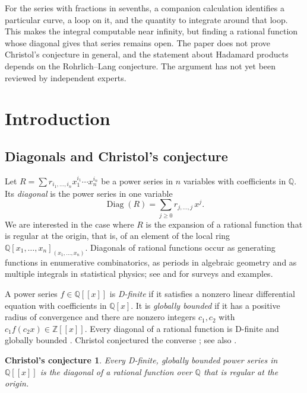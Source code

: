 \documentclass[11pt]{amsart}
\newtheorem*{conjecture*}{Christol's conjecture}
\theoremstyle{definition}
\theoremstyle{remark}
\numberwithin{equation}{section}
\newcommand{\Q}{\mathbb{Q}}
\newcommand{\Z}{\mathbb{Z}}
\DeclareMathOperator{\Diag}{Diag}
\begin{document}
For the series with fractions in sevenths, a companion calculation identifies a particular curve, a loop on it, and the quantity to integrate around that loop. This makes the integral computable near infinity, but finding a rational function whose diagonal gives that series remains open. The paper does not prove Christol's conjecture in general, and the statement about Hadamard products depends on the Rohrlich--Lang conjecture. The argument has not yet been reviewed by independent experts.

\setcounter{tocdepth}{1}
\tableofcontents

\section{Introduction}\label{sec:intro}

\subsection{Diagonals and Christol's conjecture}
Let $R=\sum r_{i_1,\dots,i_n}x_1^{i_1}\cdots x_n^{i_n}$ be a power series in $n$ variables with coefficients in $\Q$. Its \emph{diagonal} is the power series in one variable
\[
\Diag(R)=\sum_{j\ge0}r_{j,\dots,j}\,x^j .
\]
We are interested in the case where $R$ is the expansion of a rational function that is regular at the origin, that is, of an element of the local ring $\Q[x_1,\dots,x_n]_{(x_1,\dots,x_n)}$. Diagonals of rational functions occur as generating functions in enumerative combinatorics, as periods in algebraic geometry and as multiple integrals in statistical physics; see \citet{Christol2015} and \citet{BostanEtAl2013} for surveys and examples.

A power series $f\in\Q[[x]]$ is \emph{D-finite} if it satisfies a nonzero linear differential equation with coefficients in $\Q[x]$. It is \emph{globally bounded} if it has a positive radius of convergence and there are nonzero integers $c_1,c_2$ with $c_1f(c_2x)\in\Z[[x]]$. Every diagonal of a rational function is D-finite \citep{Christol1985,Lipshitz1988} and globally bounded \citep{Christol1990}. Christol conjectured the converse \citep{Christol1987,Christol1990}; see also \citet[Conjecture~10]{Christol2015}.

\begin{conjecture*}
Every D-finite, globally bounded power series in $\Q[[x]]$ is the diagonal of a rational function over $\Q$ that is regular at the origin.
\end{conjecture*}
\end{document}
